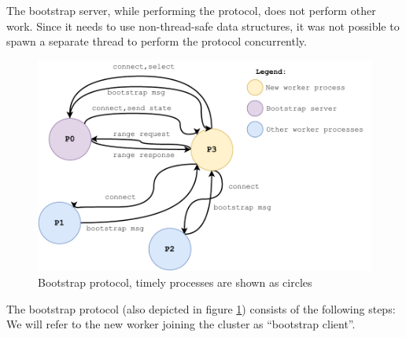 \documentclass[12pt]{extarticle}
\begin{document}
The bootstrap server, while performing the protocol, does not perform other work. Since it needs to use non-thread-safe data
structures, it was not possible to spawn a separate thread to perform the protocol concurrently.

\begin{figure}[h]
    \centerline{\includegraphics[width=.8\linewidth]{imgs/bootstrapprotocol.pdf}}
    \caption{Bootstrap protocol, timely processes are shown as circles}
    \label{fig:bootstrapprotocol}
\end{figure}

The bootstrap protocol (also depicted in figure \ref{fig:bootstrapprotocol}) consists of the following steps:
We will refer to the new worker joining the cluster as ``bootstrap client''.
\end{document}
